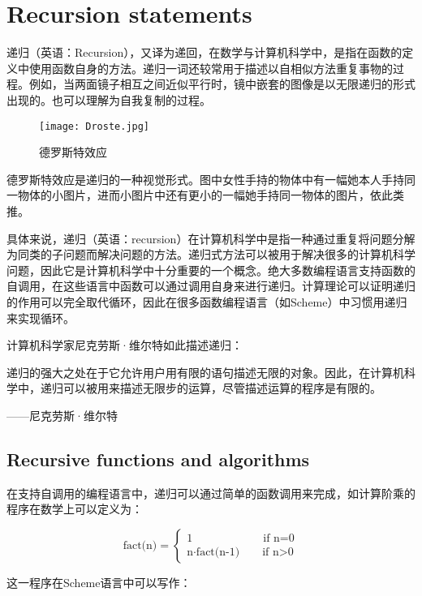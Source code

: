 \chapter{Recursion statements}

递归（英语：Recursion），又译为递回，在数学与计算机科学中，是指在函数的定义中使用函数自身的方法。递归一词还较常用于描述以自相似方法重复事物的过程。例如，当两面镜子相互之间近似平行时，镜中嵌套的图像是以无限递归的形式出现的。也可以理解为自我复制的过程。

\begin{figure}[!h]
\centering
\texttt{[image: Droste.jpg]}
\caption{德罗斯特效应}
\label{Droste}
\end{figure}

德罗斯特效应是递归的一种视觉形式。图中女性手持的物体中有一幅她本人手持同一物体的小图片，进而小图片中还有更小的一幅她手持同一物体的图片，依此类推。


具体来说，递归（英语：recursion）在计算机科学中是指一种通过重复将问题分解为同类的子问题而解决问题的方法。递归式方法可以被用于解决很多的计算机科学问题，因此它是计算机科学中十分重要的一个概念。绝大多数编程语言支持函数的自调用，在这些语言中函数可以通过调用自身来进行递归。计算理论可以证明递归的作用可以完全取代循环，因此在很多函数编程语言（如Scheme）中习惯用递归来实现循环。

计算机科学家尼克劳斯·维尔特如此描述递归：

\textsf{递归的强大之处在于它允许用户用有限的语句描述无限的对象。因此，在计算机科学中，递归可以被用来描述无限步的运算，尽管描述运算的程序是有限的。}

\begin{flushright}
——尼克劳斯·维尔特
\end{flushright}



\section{Recursive functions and algorithms}


在支持自调用的编程语言中，递归可以通过简单的函数调用来完成，如计算阶乘的程序在数学上可以定义为：

\[\text{fact(n)}=\begin{cases}
1	\qquad \qquad \qquad\  \text{if n=0}\\
\text{n}\cdot \text{fact(n-1)} \qquad \text{if n>0}
\end{cases}\]

这一程序在Scheme语言中可以写作：

